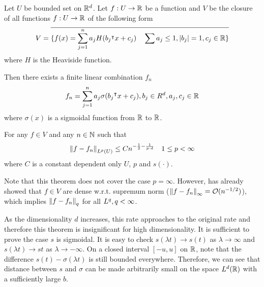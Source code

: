 \begin{theorem}
    \label{thm:improve_barron}
    Let $U$ be bounded set on $\mathbb{R}^d$. Let $f: U \to \mathbb{R}$ be a function and $V$ be
    the closure of all functions $f: U \to \mathbb{R}$ of the following form
    \begin{equation}
        V = \overline{
            \{f(x) = \sum_{j=1}^n a_j H(b_j{}^{\intercal} x + c_j) \quad 
            \sum a_j \leq 1, \left| b_j \right| = 1, c_j \in \mathbb{R} \}
            }
    \end{equation}
    where $H$ is the Heaviside function.

    Then there exists a finite linear combination $f_n$ 
    \begin{equation}
        f_n = \sum_{j=1}^n a_j \sigma(b_j{}^{\intercal} x + c_j), b_j \in R^d, a_j, c_j \in \mathbb{R}
    \end{equation}
    where $\sigma(x)$ is a sigmoidal function from $\mathbb{R}$ to $\mathbb{R}$.

    For any $f \in V$ and any $n \in \mathbb{N}$ such that 
    \begin{equation}
        \left\| f- f_n \right\|_{L^{p}(U)} \leq C n^{-\frac{1}{2} - \frac{1}{p \cdot d}}
        \quad 1 \leq p < \infty
    \end{equation}
    where $C$ is a constant dependent only $U$, $p$ and $s(\cdot)$.
\end{theorem}


Note that this theorem does not cover the case $p = \infty$. However,
\cite{barronUniversalApproximationBounds1993} has already showed that $f\in V$ are
dense w.r.t. supremum norm ($\left\| f - f_n \right\|_{\infty} = \mathcal{O}(n^{-1/2})$), which
implies $\left\| f-f_n \right\|_{q}$ for all $L^{q}, q<\infty$.

As the dimensionality $d$ increases, this rate approaches to the original rate
and therefore this theorem is insignificant for high dimensionality. It is
sufficient to prove the case $s$ is sigmoidal. It is easy to check $s(\lambda t)
\to s(t)$ as $\lambda \to \infty$ and $s(\lambda t) \to s{t}$ as $\lambda \to
-\infty$. On a closed interval $[-u, u]$ on $\mathbb{R}$, note that the difference $s(t)
- \sigma(\lambda t)$ is still bounded everywhere. Therefore, we can see that
distance between $s$ and $\sigma$ can be made arbitrarily small on the space
$L^{d}(\mathbb{R})$ with a sufficiently large $b$.

